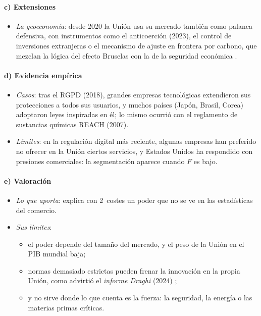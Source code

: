 \documentclass[11pt]{article}
\begin{document}
\paragraph{c) Extensiones}

\begin{itemize}
\item \emph{La geoeconomía}: desde 2020 la Unión usa su mercado también como palanca defensiva, con instrumentos como el anticoerción (2023), el control de inversiones extranjeras o el mecanismo de ajuste en frontera por carbono, que mezclan la lógica del efecto Bruselas con la de la seguridad económica  .
\end{itemize}

\paragraph{d) Evidencia empírica}

\begin{itemize}
\item \emph{Casos}: tras el RGPD (2018), grandes empresas tecnológicas extendieron sus protecciones a todos sus usuarios, y muchos países (Japón, Brasil, Corea) adoptaron leyes inspiradas en él; lo mismo ocurrió con el reglamento de sustancias químicas REACH (2007)\nocite{Bradford2020Brussels}.
\item \emph{Límites}: en la regulación digital más reciente, algunas empresas han preferido no ofrecer en la Unión ciertos servicios, y Estados Unidos ha respondido con presiones comerciales: la segmentación aparece cuando $F$ es bajo.
\end{itemize}

\paragraph{e) Valoración}

\begin{itemize}
\item \emph{Lo que aporta}: explica con 2~costes un poder que no se ve en las estadísticas del comercio.
\item \emph{Sus límites}:
  \begin{itemize}
  \item el poder depende del tamaño del mercado, y el peso de la Unión en el PIB mundial baja;
  \item normas demasiado estrictas pueden frenar la innovación en la propia Unión, como advirtió el \emph{informe Draghi} (2024) ;
  \item y no sirve donde lo que cuenta es la fuerza: la seguridad, la energía o las materias primas críticas.
  \end{itemize}
\end{itemize}
\end{document}
